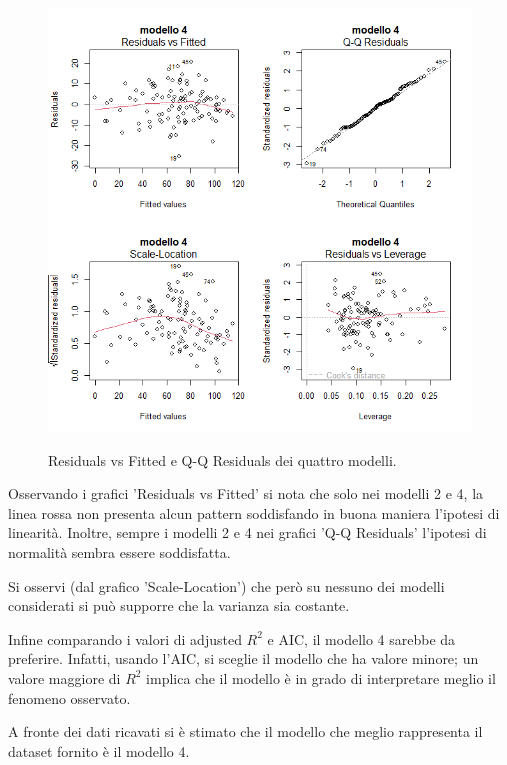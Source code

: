 \begin{figure}[H]
	\centering
	\includegraphics[width=0.95\linewidth]{../graphs/diagnostica/diagnostica_stepwise_iterations}
	\label{fig:diagnosticaridotto}
	\caption{Residuals vs Fitted e Q-Q Residuals dei quattro modelli.}
\end{figure}
Osservando i grafici 'Residuals vs Fitted' si nota che solo nei modelli 2 e 4, la linea rossa non presenta alcun pattern soddisfando in buona maniera l'ipotesi di linearità. Inoltre, sempre i modelli 2 e 4 nei grafici 'Q-Q Residuals' l'ipotesi di normalità sembra essere soddisfatta. 

Si osservi (dal grafico 'Scale-Location') che però su nessuno dei modelli considerati si può supporre che la varianza sia costante.

Infine comparando i valori di adjusted $R^2$ e AIC, il modello 4 sarebbe da preferire. Infatti, usando l'AIC, si sceglie il modello che ha valore minore; un valore maggiore di $R^2$ implica che il modello è in grado di interpretare meglio il fenomeno osservato.

A fronte dei dati ricavati si è stimato che il modello che meglio rappresenta il dataset fornito è il modello 4.


